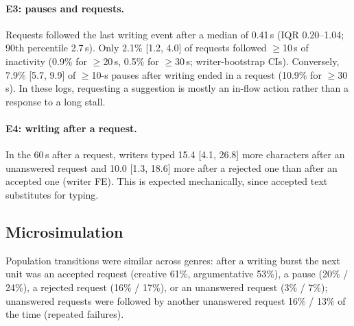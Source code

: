 \documentclass[10pt]{article}
\begin{document}
\paragraph{E3: pauses and requests.} Requests followed the last writing event after a median of 0.41\,s (IQR 0.20--1.04; 90th percentile 2.7\,s). Only 2.1\% [1.2, 4.0] of requests followed $\geq$10\,s of inactivity (0.9\% for $\geq$20\,s, 0.5\% for $\geq$30\,s; writer-bootstrap CIs). Conversely, 7.9\% [5.7, 9.9] of $\geq$10-s pauses after writing ended in a request (10.9\% for $\geq$30\,s). In these logs, requesting a suggestion is mostly an in-flow action rather than a response to a long stall.
\paragraph{E4: writing after a request.} In the 60\,s after a request, writers typed 15.4 [4.1, 26.8] more characters after an unanswered request and 10.0 [1.3, 18.6] more after a rejected one than after an accepted one (writer FE). This is expected mechanically, since accepted text substitutes for typing.

\subsection{Microsimulation}
Population transitions were similar across genres: after a writing burst the next unit was an accepted request (creative 61\%, argumentative 53\%), a pause (20\% / 24\%), a rejected request (16\% / 17\%), or an unanswered request (3\% / 7\%); unanswered requests were followed by another unanswered request 16\% / 13\% of the time (repeated failures).
\end{document}
